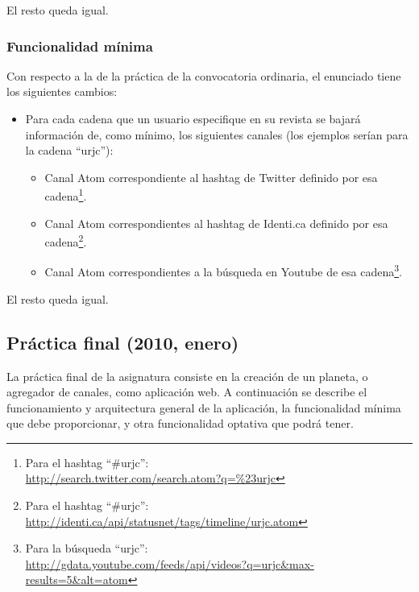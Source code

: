 El resto queda igual.

\subsubsection{Funcionalidad mínima}

Con respecto a la de la práctica de la convocatoria ordinaria, el enunciado tiene los siguientes cambios:

\begin{itemize}
\item Para cada cadena que un usuario especifique en su revista se bajará información de, como mínimo, los siguientes canales (los ejemplos serían para la cadena ``urjc''):
  \begin{itemize}
  \item Canal Atom correspondiente al hashtag de Twitter definido por esa cadena\footnote{Para el hashtag ``\#urjc'': \\
    \url{http://search.twitter.com/search.atom?q=\%23urjc}}.
  \item Canal Atom correspondientes al hashtag de Identi.ca definido por esa cadena\footnote{Para el hashtag ``\#urjc'': \\
    \url{http://identi.ca/api/statusnet/tags/timeline/urjc.atom}}.
  \item Canal Atom correspondientes a la búsqueda en Youtube de esa cadena\footnote{Para la búsqueda ``urjc'': \\
\url{http://gdata.youtube.com/feeds/api/videos?q=urjc&max-results=5&alt=atom}}.
  \end{itemize}

\end{itemize}

El resto queda igual.



\subsection{Práctica final (2010, enero)}

La práctica final de la asignatura consiste en la creación de un planeta, o agregador de canales, como aplicación web. A continuación se describe el funcionamiento y arquitectura general de la aplicación, la funcionalidad mínima que debe proporcionar, y otra funcionalidad optativa que podrá tener.


